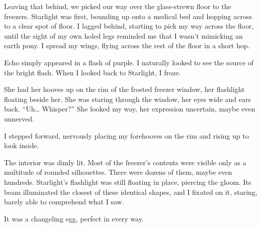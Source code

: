 Leaving that behind, we picked our way over the glass-strewn floor to the freezers. Starlight was first, bounding up onto a medical bed and hopping across to a clear spot of floor. I lagged behind, starting to pick my way across the floor, until the sight of my own holed legs reminded me that I wasn’t mimicking an earth pony. I spread my wings, flying across the rest of the floor in a short hop.

Echo simply appeared in a flash of purple. I naturally looked to see the source of the bright flash. When I looked back to Starlight, I froze.

She had her hooves up on the rim of the frosted freezer window, her flashlight floating beside her. She was staring through the window, her eyes wide and ears back. “Uh… Whisper?” She looked my way, her expression uncertain, maybe even unnerved.

I stepped forward, nervously placing my forehooves on the rim and rising up to look inside.

The interior was dimly lit. Most of the freezer’s contents were visible only as a multitude of rounded silhouettes. There were dozens of them, maybe even hundreds. Starlight’s flashlight was still floating in place, piercing the gloom. Its beam illuminated the closest of these identical shapes, and I fixated on it, staring, barely able to comprehend what I saw.

It was a changeling egg, perfect in every way.